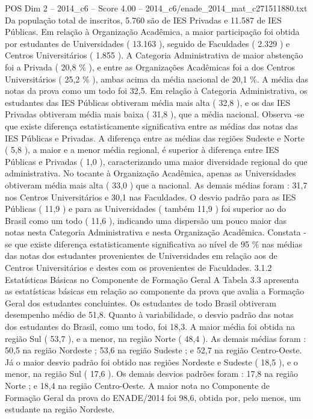 \begin{textsample}{POS Dim 2 – 2014\_c6 – Score 4.00 – 2014\_c6/enade\_2014\_mat\_c271511880.txt}
Da população total de inscritos, 5.760 são de IES Privadas e 11.587 de IES Públicas.
Em relação à Organização Acadêmica, a maior participação foi obtida por estudantes de Universidades ( 13.163 ), seguido de Faculdades ( 2.329 ) e Centros Universitários ( 1.855 ).
A Categoria Administrativa de maior abstenção foi a Privada ( 20,8 \% ), e entre as Organizações Acadêmicas foi a dos Centros Universitários ( 25,2 \% ), ambas acima da média nacional de 20,1 \%.
A média das notas da prova como um todo foi 32,5.
Em relação à Categoria Administrativa, os estudantes das IES Públicas obtiveram média mais alta ( 32,8 ), e os das IES Privadas obtiveram média mais baixa ( 31,8 ), que a média nacional.
Observa -se que existe diferença estatisticamente significativa entre as médias das notas das IES Públicas e Privadas.
A diferença entre as médias das regiões Sudeste e Norte ( 5,8 ), a maior e a menor média regional, é superior à diferença entre IES Públicas e Privadas ( 1,0 ), caracterizando uma maior diversidade regional do que administrativa.
No tocante à Organização Acadêmica, apenas as Universidades obtiveram média mais alta ( 33,0 ) que a nacional.
As demais médias foram : 31,7 nos Centros Universitários e 30,1 nas Faculdades.
O desvio padrão para as IES Públicas ( 11,9 ) e para as Universidades ( também 11,9 ) foi superior ao do Brasil como um todo ( 11,6 ), indicando uma dispersão um pouco maior das notas nesta Categoria Administrativa e nesta Organização Acadêmica.
Constata -se que existe diferença estatisticamente significativa ao nível de 95 \% nas médias das notas dos estudantes provenientes de Universidades em relação aos de Centros Universitários e destes com os provenientes de Faculdades. 3.1.2 Estatísticas Básicas no Componente de Formação Geral A Tabela 3.3 apresenta as estatísticas básicas em relação ao componente da prova que avalia a Formação Geral dos estudantes concluintes.
Os estudantes de todo Brasil obtiveram desempenho médio de 51,8.
Quanto à variabilidade, o desvio padrão das notas dos estudantes do Brasil, como um todo, foi 18,3.
A maior média foi obtida na região Sul ( 53,7 ), e a menor, na região Norte ( 48,4 ).
As demais médias foram : 50,5 na região Nordeste ; 53,6 na região Sudeste ; e 52,7 na região Centro-Oeste.
Já o maior desvio padrão foi obtido nas regiões Nordeste e Sudeste ( 18,5 ), e o menor, na região Sul ( 17,6 ).
Os demais desvios padrões foram : 17,8 na região Norte ; e 18,4 na região Centro-Oeste.
A maior nota no Componente de Formação Geral da prova do ENADE/2014 foi 98,6, obtida por, pelo menos, um estudante na região Nordeste.

\end{textsample}
